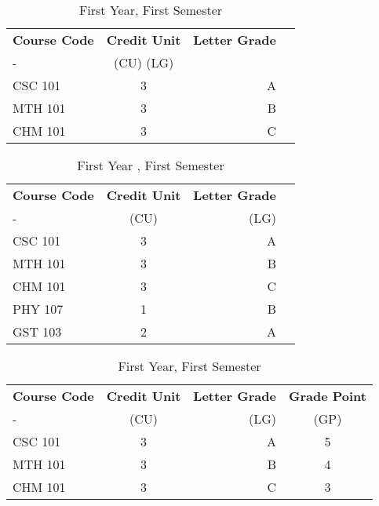 \documentclass{article}
\begin{document}
	
	\begin{table}[h!]
		\begin{center}
			\caption{First Year, First Semester}
			\label{tab:table1}
			\begin{tabular}{l|c|r|c}
			  \textbf{Course Code} & \textbf{Credit Unit} &
			  \textbf{Letter Grade}\\
			  - & (CU) (LG) \\
			  \hline
		      CSC 101 & 3 & A\\
			  MTH 101 & 3 & B\\
			  CHM 101 & 3 & C\\
		    \end{tabular}
		  \end{center}
	    \end{table}
	
	
	\begin{table}[h!]
	\begin{center}
		\caption{First Year , First Semester}
		\label{tab:table1}
		\begin{tabular}{l|c|r|c}
			\textbf{Course Code} & \textbf{Credit Unit} &
			\textbf{Letter Grade}\\
			- & (CU) & (LG) \\
			\hline
			CSC 101 & 3 & A\\
			MTH 101 & 3 & B\\
			CHM 101 & 3 & C\\
			PHY 107 & 1 & B\\
			GST 103 & 2 & A\\
		\end{tabular}
	\end{center}
\end{table}

\begin{table}[h!]
	\begin{center}
		\caption{First Year, First Semester}
		\label{tab:table1}
		\begin{tabular}{l|c|r|c}
			\textbf{Course Code} & \textbf{Credit Unit} &
			\textbf{Letter Grade} & \textbf{Grade Point}\\
			- & (CU) & (LG) & (GP) \\
			\hline
			CSC 101 & 3 & A & 5\\
			MTH 101 & 3 & B & 4\\
			CHM 101 & 3 & C & 3\\
		\end{tabular}
	\end{center}
\end{table}	
	
\end{document}
